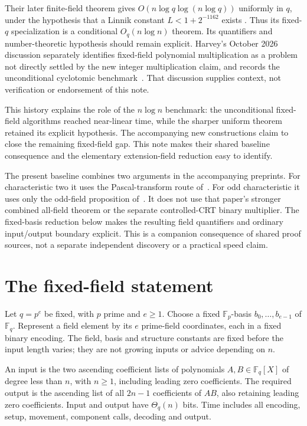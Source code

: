 \documentclass[11pt]{article}
\newcommand{\F}{\mathbb F}
\begin{document}
Their later finite-field theorem gives
$O(n\log q\log(n\log q))$ uniformly in $q$, under the hypothesis
that a Linnik constant $L<1+2^{-1162}$ exists
\cite[Theorem 1.2]{HVH22Finite}. Thus its fixed-$q$ specialization
is a conditional $O_q(n\log n)$ theorem. Its quantifiers and
number-theoretic hypothesis should remain explicit. Harvey's
October 2026 discussion separately identifies fixed-field polynomial
multiplication as a problem not directly settled by the new integer
multiplication claim, and records the unconditional cyclotomic
benchmark~\cite[Section 4, p.~4]{Harvey26}. That discussion supplies
context, not verification or endorsement of this note.

This history explains the role of the $n\log n$ benchmark: the
unconditional fixed-field algorithms reached near-linear time,
while the sharper uniform theorem retained its explicit hypothesis.
The accompanying new constructions claim to close the remaining
fixed-field gap. This note makes their shared baseline consequence
and the elementary extension-field reduction easy to identify.

The present baseline combines two arguments in the accompanying
preprints. For characteristic two it uses the Pascal-transform route
of~\cite{SimpleBinary}. For odd characteristic it uses only the
odd-field proposition of~\cite{GeneralBest}. It does not use that
paper's stronger combined all-field theorem or the separate
controlled-CRT binary multiplier. The fixed-basis reduction below
makes the resulting field quantifiers and ordinary input/output
boundary explicit. This is a companion consequence of shared proof
sources, not a separate independent discovery or a practical speed claim.

\section{The fixed-field statement}
Let $q=p^e$ be fixed, with $p$ prime and $e\ge1$. Choose a fixed
$\F_p$-basis $b_0,\ldots,b_{e-1}$ of $\F_q$. Represent a field
element by its $e$ prime-field coordinates, each in a fixed binary
encoding. The field, basis and structure constants are fixed before
the input length varies; they are not growing inputs or advice
depending on $n$.

An input is the two ascending coefficient lists of polynomials
$A,B\in\F_q[X]$ of degree less than $n$, with $n\ge1$, including
leading zero coefficients. The required output is the ascending list
of all $2n-1$ coefficients of $AB$, also retaining leading zero
coefficients. Input and output have $\Theta_q(n)$ bits. Time includes
all encoding, setup, movement, component calls, decoding and output.
\end{document}
